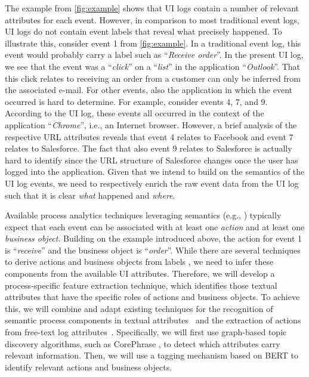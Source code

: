 The example from \autoref{fig:example} shows that UI logs contain a number of relevant attributes for each event. However, in comparison to most traditional event logs, UI logs do not contain event labels that reveal what precisely happened. To illustrate this, consider event 1 from \autoref{fig:example}. In a traditional event log, this event would probably carry a label such as ``\textit{Receive order}''. In the present UI log, we see that the event was a ``\textit{click}'' on a ``\textit{list}'' in the application ``\textit{Outlook}''. That this click relates to receiving an order from a customer can only be inferred from the associated e-mail. For other events, also the application in which the event occurred is hard to determine. For example, consider events 4, 7, and 9. According to the UI log, these events all occurred in the context of the application ``\textit{Chrome}'', i.e., an Internet browser. However, a brief analysis of the respective URL attributes reveals that event 4 relates to Facebook and event 7 relates to Salesforce. The fact that also event 9 relates to Salesforce is actually hard to identify since the URL structure of Salesforce changes once the user has logged into the application. Given that we intend to build on the semantics of the UI log events, we need to respectively enrich the raw event data from the UI log such that it is clear \textit{what} happened and \textit{where}. 

 Available process analytics techniques leveraging semantics (e.g., \cite{leopold2012probabilistic,leopold2015_jss,van2021natural}) typically expect that each event can be associated with at least one \textit{action} and at least one \textit{business object}. Building on the example introduced above, the action for event 1 is ``\textit{receive}'' and the business object is ``\textit{order}''. While there are several techniques to derive actions and business objects from labels \cite{leopold2012refactoring,leopold2019using,rebmann2021extracting}, we need to infer these components from the available UI attributes. Therefore, we will develop a process-specific feature extraction technique, which identifies those textual attributes that have the specific roles of actions and business objects. To achieve this, we will combine and adapt existing techniques for the recognition of semantic process components in textual attributes~\cite{rebmann2021extracting} and the extraction of actions from free-text log attributes~\cite{gupta2020analyzing}. Specifically, we will first use graph-based topic discovery algorithms, such as CorePhrase \cite{hammouda2005corephrase}, to detect which attributes carry relevant information. Then, we will use a tagging mechanism based on BERT \cite{Devlin2019} to identify relevant actions and business objects. 

